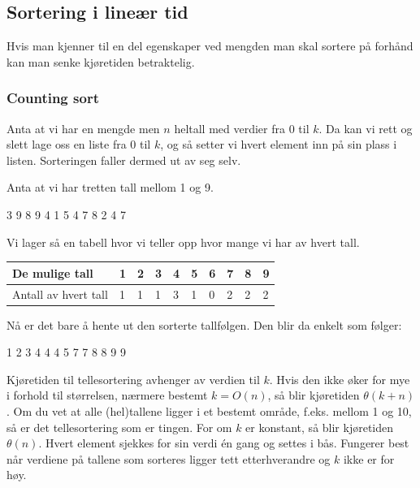 \subsection{Sortering i lineær tid}
Hvis man kjenner til en del egenskaper ved mengden man skal sortere på forhånd kan man senke kjøretiden betraktelig.

\subsubsection{Counting sort}
Anta at vi har en mengde men $n$ heltall med verdier fra 0 til $k$. Da kan vi rett og slett lage oss en liste fra 0 til $k$, og så setter vi hvert element inn på sin plass i listen. Sorteringen faller dermed ut av seg selv.

\begin{boxed}
Anta at vi har tretten tall mellom 1 og 9.
\begin{center}
3 9 8 9 4 1 5 4 7 8 2 4 7
\end{center}
Vi lager så en tabell hvor vi teller opp hvor mange vi har av hvert tall.

\begin{table}[H]
    \label{tab:tellesortering}
    \centering
    \begin{tabular}{|L{10em} | L{2em}|L{2em}|L{2em}|L{2em}|L{2em}|L{2em}|L{2em}|L{2em}|L{2em}|}
        \hline
        De mulige tall & 1 & 2 & 3 & 4 & 5 & 6 & 7 & 8 & 9\\
        \hline
        Antall av hvert tall & 1 & 1 & 1 & 3 & 1 & 0 & 2 & 2 & 2\\
         \hline
    \end{tabular}
\end{table}
Nå er det bare å hente ut den sorterte tallfølgen. Den blir da enkelt som følger:
\begin{center}
1 2 3 4 4 4 5 7 7 8 8 9 9
\end{center}
\end{boxed}

\noindent Kjøretiden til tellesortering avhenger av verdien til $k$. Hvis den ikke øker for mye i forhold til størrelsen, nærmere bestemt $k = O(n)$, så blir kjøretiden $\theta(k + n)$. Om du vet at alle (hel)tallene ligger i et bestemt område, f.eks. mellom 1 og 10, så er det tellesortering som er tingen. For om $k$ er konstant, så blir kjøretiden $\theta(n)$. Hvert element sjekkes for sin verdi én gang og settes i bås. Fungerer best når verdiene på tallene som sorteres ligger tett etterhverandre og $k$ ikke er for høy.

